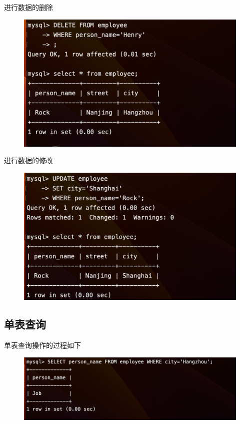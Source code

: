\documentclass{article}
\begin{document}
进行数据的删除
\begin{figure}[H]
    \centering
    \includegraphics[width=1\textwidth]{lab2/7.png}
    \end{figure}

进行数据的修改

\begin{figure}[H]
    \centering
    \includegraphics[width=1\textwidth]{lab2/8.png}
    \end{figure}

\subsection*{单表查询}

单表查询操作的过程如下

\begin{figure}[H]
    \centering
    \includegraphics[width=1\textwidth]{lab2/9.png}
    \end{figure}
\end{document}
